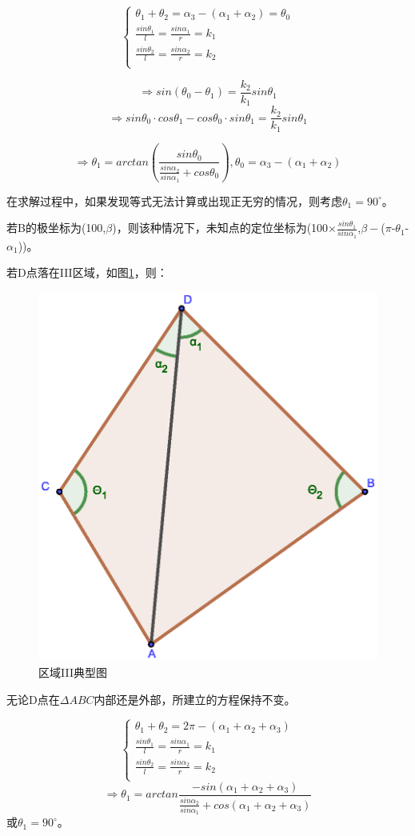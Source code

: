 \documentclass{ctexart}
\begin{document}
\begin{equation}
    \left\{
              \begin{array}{ll}
                \theta_1+\theta_2=\alpha_3-(\alpha_1+\alpha_2)=\theta_0\\
                \frac{sin\theta_1}{l}=\frac{sin\alpha_1}{r}=k_1\\
                \frac{sin\theta_2}{l}=\frac{sin\alpha_2}{r}=k_2\\

              \end{array}
            \right.
\end{equation}

\[
    \Rightarrow sin(\theta_0-\theta_1)=\frac{k_2}{k_1}sin\theta_1
\]
\[
    \Rightarrow sin\theta_0 \cdot cos\theta_1-cos\theta_0 \cdot sin\theta_1=\frac{k_2}{k_1}sin\theta_1
\]

\[
    \Rightarrow \theta_1=arctan(\frac{sin\theta_0}{\frac{sin\alpha_2}{sin\alpha_1}+cos\theta_0}),\theta_0=\alpha_3-(\alpha_1+\alpha_2)
\]

在求解过程中，如果发现等式无法计算或出现正无穷的情况，则考虑$\theta_1=90^{\circ}$。

若B的极坐标为(100,$\beta$)，则该种情况下，未知点的定位坐标为(100$\times\frac{sin\theta_1}{sin\alpha_1}$,$\beta -$($\pi$-$\theta_1$-$\alpha_1$))。



若D点落在III区域，如图\ref{区域III典型图}，则：

\begin{figure}[htbp]
  \centering
  \includegraphics[width=0.40\linewidth]{pic/case3+.eps}
  \caption{区域III典型图}
  \label{区域III典型图}
  \end{figure} 


无论D点在$\Delta ABC$内部还是外部，所建立的方程保持不变。

\begin{equation}
    \left\{
              \begin{array}{ll}
                \theta_1+\theta_2=2\pi-(\alpha_1+\alpha_2+\alpha_3)\\
                \frac{sin\theta_1}{l}=\frac{sin\alpha_1}{r}=k_1\\
                \frac{sin\theta_2}{l}=\frac{sin\alpha_2}{r}=k_2\\

              \end{array}
            \right.
\end{equation}
\[
    \Rightarrow \theta_1=arctan \frac{-sin(\alpha_1+\alpha_2+\alpha_3)}{\frac{sin\alpha_2}{sin\alpha_1}+cos(\alpha_1+\alpha_2+\alpha_3)}
\]
或$\theta_1=90^{\circ}$。
\end{document}
